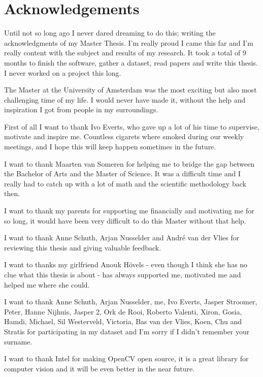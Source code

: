 \documentclass[a4paper, 11pt]{book}
\begin{document}
\setcounter{page}{1}

\tableofcontents{}
\listoffigures{}
\listoftables{}

\chapter*{Acknowledgements}
Until not so long ago I never dared dreaming to do this; writing the acknowledgments of my Master Thesis. I'm really proud I came this far and I'm really content with the subject and results of my research. It took a total of 9 months to finish the software, gather a dataset, read papers and write this thesis. I never worked on a project this long.

The Master at the University of Amsterdam was the most exciting but also most challenging time of my life. I would never have made it, without the help and inspiration I got from people in my surroundings. 

First of all I want to thank Ivo Everts, who gave up a lot of his time to supervise, motivate and inspire me. Countless cigarets where smoked during our weekly meetings, and I hope this will keep happen sometimes in the future.

I want to thank Maarten van Someren for helping me to bridge the gap between the Bachelor of Arts and the Master of Science. It was a difficult time and I really had to catch up with a lot of math and the scientific methodology back then. 

I want to thank my parents for supporting me financially and motivating me for so long, it would have been very difficult to do this Master without that help.

I want to thank Anne Schuth, Arjan Nusselder and Andr\'{e} van der Vlies for reviewing this thesis and giving valuable feedback.

I want to thanks my girlfriend Anouk H\"{o}vels - even though I think she has no clue what this thesis is about - has always supported me, motivated me and helped me where she could.

I want to thank Anne Schuth, Arjan Nusselder, me, Ivo Everts, Jasper Stroomer, Peter, Hanne Nijhuis, Jasper 2, Ork de Rooi, Roberto Valenti, Xiron, Gosia, Hamdi, Michael, Sil Westerveld, Victoria, Bas van der Vlies, Koen, Chu and Stratis for participating in my dataset and I'm sorry if I didn't remember your surname. 

I want to thank Intel for making OpenCV open source, it is a great library for computer vision and it will be even better in the near future. 
\end{document}
